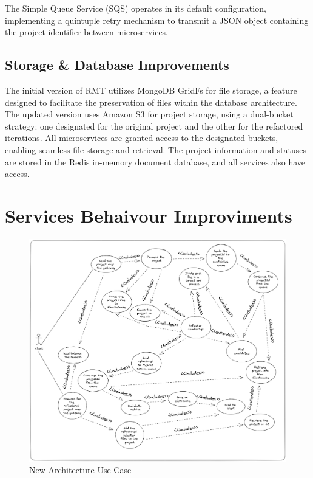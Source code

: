 The Simple Queue Service (SQS) operates in its default configuration, implementing a quintuple retry mechanism to transmit a JSON object containing the project identifier between microservices.

\subsection{Storage \& Database Improvements}

The initial version of RMT utilizes MongoDB GridFs for file storage, a feature designed to facilitate the preservation of files within the database architecture. The updated version uses Amazon S3 for project storage, using a dual-bucket strategy: one designated for the original project and the other for the refactored iterations. All microservices are granted access to the designated buckets, enabling seamless file storage and retrieval. The project information and statuses are stored in the Redis in-memory document database, and all services also have access.

\section{Services Behaivour Improviments}
\label{sub-async}

\begin{figure}[ht!]
\SetCaptionWidth{\textwidth}
\caption{New Architecture Use Case}
\label{fig-usecasenew}
\includegraphics[width =\textwidth, scale=0.2]{Chapter-5/Figures/usecasenew.png}
\end{figure}
\FloatBarrier


